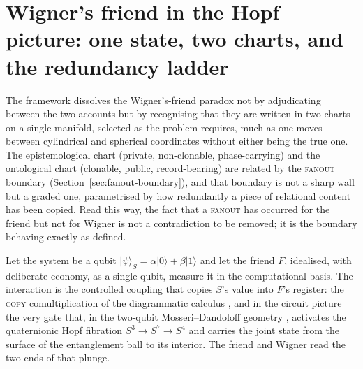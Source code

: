 
\section{Wigner's friend in the Hopf picture: one state, two charts, and the redundancy ladder}
\label{sec:wigners-friend}

The framework dissolves the Wigner's-friend paradox \autocite{wigner_1961} not by
adjudicating between the two accounts but by recognising that they are written in
two charts on a single manifold, selected as the problem requires, much as one
moves between cylindrical and spherical coordinates without either being the true
one. The epistemological chart (private, non-clonable, phase-carrying) and the
ontological chart (clonable, public, record-bearing) are related by the
\textsc{fanout} boundary (Section~\ref{sec:fanout-boundary}), and that boundary
is not a sharp wall but a graded one, parametrised by how redundantly a piece of
relational content has been copied. Read this way, the fact that a \textsc{fanout}
has occurred for the friend but not for Wigner is not a contradiction to be
removed; it is the boundary behaving exactly as defined.

Let the system be a qubit $\lvert\psi\rangle_{S}=\alpha\lvert 0\rangle
+\beta\lvert 1\rangle$ and let the friend $F$, idealised, with deliberate
economy, as a single qubit, measure it in the computational basis. The
interaction is the controlled coupling that copies $S$'s value into $F$'s
register: the \textsc{copy} comultiplication of the diagrammatic calculus
\autocite{CoeckeKissinger2017}, and in the circuit picture the very gate that, in
the two-qubit Mosseri--Dandoloff geometry \autocite{MosseriDandoloff2001},
activates the quaternionic Hopf fibration $S^{3}\to S^{7}\to S^{4}$ and carries
the joint state from the surface of the entanglement ball to its interior. The
friend and Wigner read the two ends of that plunge.

